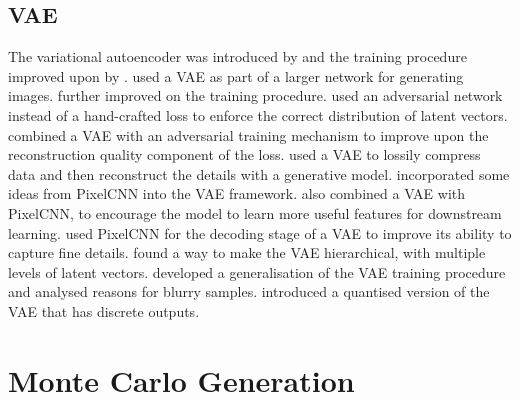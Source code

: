 \documentclass[11pt, a4paper, openany]{book}
\begin{document}
\subsection{VAE}

The variational autoencoder was introduced by \citet{vae} and the training procedure improved upon by \citet{vae2}. \citet{drawvae} used a VAE as part of a larger network for generating images. \citet{vaeflows} further improved on the training procedure. \citet{adversarialvae} used an adversarial network instead of a hand-crafted loss to enforce the correct distribution of latent vectors. \citet{vaegan} combined a VAE with an adversarial training mechanism to improve upon the reconstruction quality component of the loss. \citet{vaecompression} used a VAE to lossily compress data and then reconstruct the details with a generative model. \citet{vaeiaf} incorporated some ideas from PixelCNN into the VAE framework. \citet{vaelossy} also combined a VAE with PixelCNN, to encourage the model to learn more useful features for downstream learning. \citet{pixelvae} used PixelCNN for the decoding stage of a VAE to improve its ability to capture fine details. \citet{vaehieararchy} found a way to make the VAE hierarchical, with multiple levels of latent vectors. \citet{vaeunderstanding} developed a generalisation of the VAE training procedure and analysed reasons for blurry samples.  introduced a quantised version of the VAE that has discrete outputs.

\section{Monte Carlo Generation}
\end{document}
